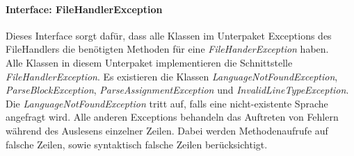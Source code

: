 \documentclass[parskip=full]{scrartcl}
\begin{document}
\paragraph{Interface: FileHandlerException}
Dieses Interface sorgt dafür, dass alle Klassen im Unterpaket Exceptions des FileHandlers die benötigten Methoden für eine \textit{FileHanderException} haben.
\\
Alle Klassen in diesem Unterpaket implementieren die Schnittstelle \textit{FileHandlerException}.
Es existieren die Klassen \textit{LanguageNotFoundException}, \textit{ParseBlockException}, \textit{ParseAssignmentException} und \textit{InvalidLineTypeException}.
Die \textit{LanguageNotFoundException} tritt auf, falls eine nicht-existente Sprache angefragt wird.
Alle anderen Exceptions behandeln das Auftreten von Fehlern während des Auslesens einzelner Zeilen.
Dabei werden Methodenaufrufe auf falsche Zeilen, sowie syntaktisch falsche Zeilen berücksichtigt.
\newpage
\end{document}
